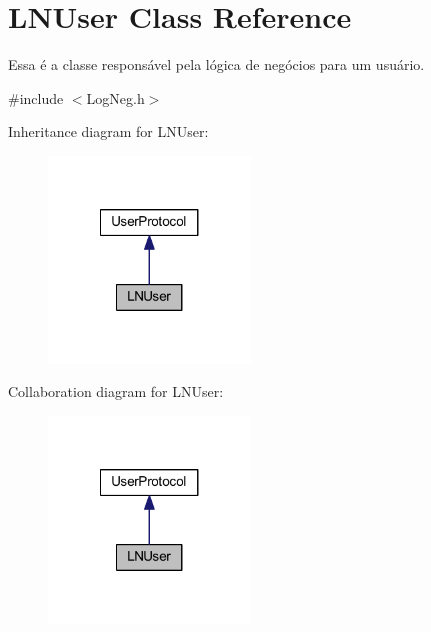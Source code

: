 \hypertarget{class_l_n_user}{\section{L\-N\-User Class Reference}
\label{class_l_n_user}
}


Essa é a classe responsável pela lógica de negócios para um usuário.  




{\ttfamily \#include $<$Log\-Neg.\-h$>$}



Inheritance diagram for L\-N\-User\-:\nopagebreak
\begin{figure}[H]
\begin{center}
\leavevmode
\includegraphics[width=152pt]{class_l_n_user__inherit__graph}
\end{center}
\end{figure}


Collaboration diagram for L\-N\-User\-:\nopagebreak
\begin{figure}[H]
\begin{center}
\leavevmode
\includegraphics[width=152pt]{class_l_n_user__coll__graph}
\end{center}
\end{figure}
